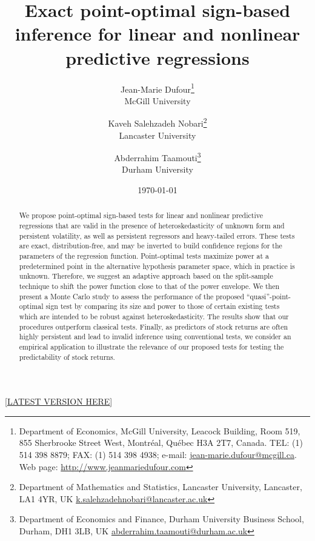 \documentclass[harvard,11pt]{article}
\begin{document}
\title{{Exact point-optimal sign-based inference for linear and nonlinear predictive regressions}}
\author{Jean-Marie Dufour\thanks{%
Department of Economics, McGill University, Leacock Building, Room 519, 855 Sherbrooke Street West, Montréal,
Québec H3A 2T7, Canada. TEL: (1) 514 398 8879; FAX: (1) 514 398 4938; e-mail: \href{emailto:jean-marie.dufour@mcgill.ca}{jean-marie.dufour@mcgill.ca}. Web
page: \href{http://www.jeanmariedufour.com}{http://www.jeanmariedufour.com}}\\
McGill University\and Kaveh Salehzadeh Nobari\thanks{%
Department of Mathematics and Statistics, Lancaster University, Lancaster, LA1 4YR, UK
\href{emailto: k.salehzadehnobari@lancaster.ac.uk}{k.salehzadehnobari@lancaster.ac.uk}}\\
Lancaster University \and Abderrahim Taamouti\thanks{%
Department of Economics and Finance, Durham University Business School, Durham, DH1 3LB, UK
\href{emailto: abderrahim.taamouti@durham.ac.uk}{abderrahim.taamouti@durham.ac.uk}}\\
Durham University}
\date{\today}
\maketitle
\begin{center}
[\href{https://kavehsn.github.io/Job-Market-Paper/Point_Optimal_Sign_Tests_Dependent_Data_2020.pdf}{\underline{LATEST VERSION HERE}}]
\end{center}


\begin{abstract}
We propose point-optimal sign-based tests for linear and nonlinear predictive regressions that are valid
 in the presence of heteroskedasticity of unknown form and persistent volatility, as well as persistent regressors and heavy-tailed errors. These tests are exact, distribution-free, and may be inverted to build confidence regions for the parameters of the
regression function. Point-optimal tests maximize power at a predetermined point in the alternative hypothesis parameter space, which in practice is unknown. Therefore, we suggest an adaptive approach based on the split-sample technique to shift the power function close to that of the power envelope. We then present a Monte Carlo study to assess the performance of the proposed \textquotedblleft quasi\textquotedblright -point-optimal sign test by comparing its size and
power to those of certain existing tests which are intended to be robust
against heteroskedasticity. The results show that our procedures outperform classical tests. Finally, as predictors of stock returns are often highly persistent and lead to invalid inference using conventional tests, we consider an empirical application to
illustrate the relevance of our proposed tests for testing the
predictability of stock returns.
\end{abstract}
\end{document}
